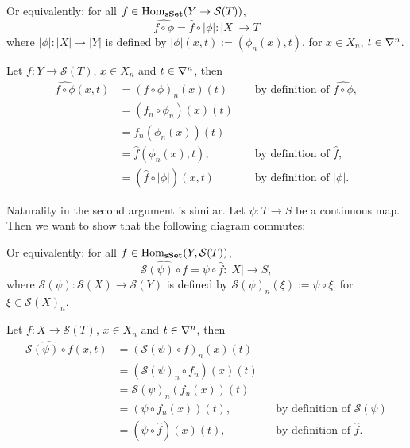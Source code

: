 \documentclass[a4paper,11pt,english]{article}
\renewcommand{\S}[1]{\mathcal{S}(#1)}
\begin{document}
\begin{exercise}[1]
\begin{center}
\end{center}

Or equivalently: for all $f \in \Hom_{\sSet}(Y \to \S T)$,
\[ \hat{f \circ \phi} = \hat f \circ |\phi| : |X| \to T \]
where $|\phi|: |X|\to|Y|$ is
defined by $|\phi|(x,t) := (\phi_n(x), t)$, for $x \in X_n$, $t \in \nabla^n$.

Let $f: Y \to \S T$, $x \in X_n$ and $t \in \nabla^n$, then
\begin{align*}
\hat{f \circ \phi} (x,t) &= (f \circ \phi)_n(x)(t)
&& \text{ by definition of }\hat{f \circ \phi}, \\
&= (f_n \circ \phi_n)(x)(t)\\
&= f_n(\phi_n(x))(t) \\
&= \hat f(\phi_n(x), t), 
&& \text{ by definition of } \hat{f}, \\
&= (\hat f \circ |\phi|)(x, t) 
&& \text{ by definition of } |\phi|. 
\end{align*}

Naturality in the second argument is similar. Let $\psi: T \to S$ be a continuous
map. Then we want to show that the following diagram commutes:

\begin{center}
\end{center}

Or equivalently: for all $f\in \Hom_{\sSet}(Y, \S T)$, 
\[ \hat{{\S\psi \circ f }} = \psi \circ \hat f : |X| \to S, \]
where $\S\psi: \S X \to \S Y$ is 
defined by $\S\psi_n(\xi) := \psi \circ \xi$, for $\xi \in \S X_n$.

Let $f: X \to \S T$, $x \in X_n$ and $t \in \nabla^n$, then
\begin{align*}
\hat{\S\psi \circ f}(x,t) &= (\S\psi \circ f)_n(x)(t) \\
&= (\S\psi_n \circ f_n)(x)(t) \\
&= \S\psi_n(f_n(x))(t) \\
&= (\psi \circ f_n(x))(t), 
&& \text{by definition of } \S\psi \\
&= (\psi \circ \hat f)(x)(t), 
&& \text{by definition of } \hat f.
\end{align*}

\end{exercise}
\end{document}
